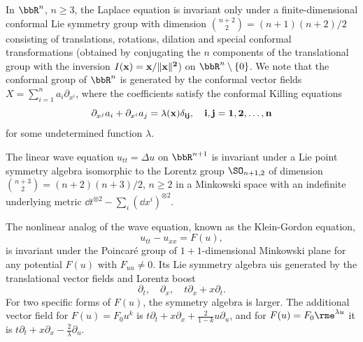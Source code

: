 \begin{example}
    In $\bbR^n$, $n\geq 3$, the Laplace equation is invariant only under a finite-dimensional conformal Lie symmetry group with dimension $\binom{n+2}{2}=(n+1)(n+2)/2$ consisting of translations, rotations, dilation and special conformal transformations (obtained by conjugating the $n$ components of the translational group with the inversion $I(\bf{x})=\bf{x}/\lVert\bf{x}\rVert^2$) on $\bbR^n\setminus\{0\}$.
    We note that the conformal group of $\bbR^n$ is generated by the conformal vector fields $X=\sum_{i=1}^n a_i\partial_{x^i}$, where the coefficients satisfy the conformal Killing equations 
    \[\partial_{x^j}a_i+\partial_{x^i}a_j=\lambda(\bf{x})\delta_{ij},\quad i,j=1,2,\ldots,n\]
    for some undetermined function $\lambda$.

    The linear wave equation $u_{tt}=\Delta u$ on $\bbR^{n+1}$ is invariant under a Lie point symmetry algebra isomorphic to the Lorentz group $\SO_{n+1,2}$ of dimension $\binom{n+3}{2}=(n+2)(n+3)/2$, $n\geq 2$ in a Minkowski space with an indefinite underlying metric $\dd t^{\otimes 2}-\sum_i (\dd x^i)^{\otimes 2}$.

    The nonlinear analog of the wave equation, known as the Klein-Gordon equation, 
    \[u_{tt}-u_{xx}=F(u),\]
    is invariant under the Poincar\'e group of $1+1$-dimensional Minkowski plane for any potential $F(u)$ with $F_{uu}\neq 0$. Its Lie symmetry algebra uis generated by the translational vector fields and Lorentz boost 
    \[\partial_t,\quad \partial_x,\quad t\partial_x+x\partial_t.\]
    For two specific forms of $F(u)$, the symmetry algebra is larger. The additional vector field for $F(u)=F_0u^k$ is $t\partial_t+x\partial_x+\frac{2}{1-k}u\partial_u$, and for $F(u)=F_0\rme^{\lambda u}$ it is $t\partial_t+x\partial_x-\frac{2}{\lambda}\partial_u$.


\end{example}
